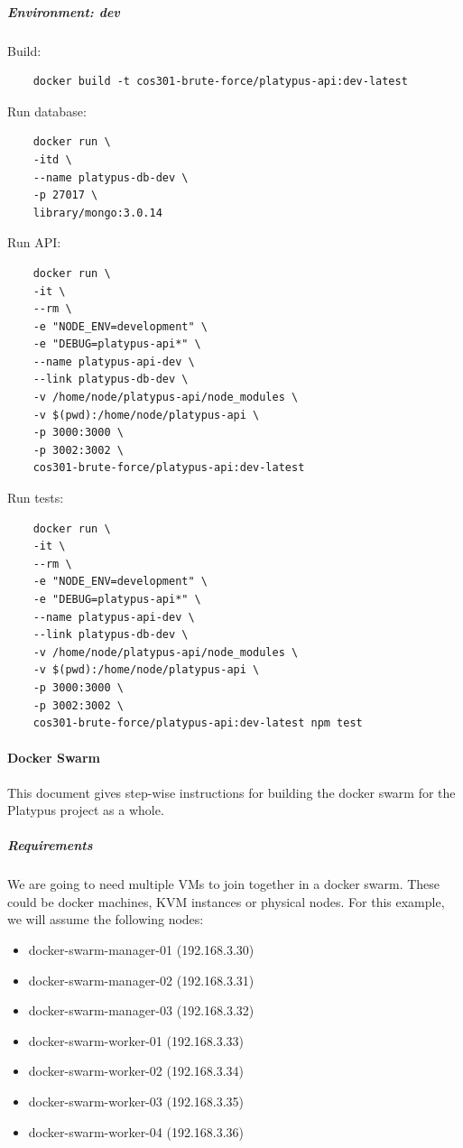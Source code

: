 \documentclass[12pt,a4paper]{article}
\begin{document}
    \subparagraph{Environment:	dev}
    \subparagraph{}
     Build: 

	\begin{lstlisting}
	docker build -t cos301-brute-force/platypus-api:dev-latest
	\end{lstlisting}

	\vspace{1cm}
	Run database:

	\begin{lstlisting}
	docker run \
    -itd \
    --name platypus-db-dev \
    -p 27017 \
    library/mongo:3.0.14
	\end{lstlisting}
	
    \vspace{1cm}
	Run API:
	
	\begin{lstlisting}
	docker run \
  	-it \
  	--rm \
  	-e "NODE_ENV=development" \
  	-e "DEBUG=platypus-api*" \
  	--name platypus-api-dev \
  	--link platypus-db-dev \
  	-v /home/node/platypus-api/node_modules \
  	-v $(pwd):/home/node/platypus-api \
  	-p 3000:3000 \
  	-p 3002:3002 \
  	cos301-brute-force/platypus-api:dev-latest
	\end{lstlisting}
	
    \vspace{1cm}
	Run tests:

    \begin{lstlisting}
	docker run \
    -it \
    --rm \
    -e "NODE_ENV=development" \
    -e "DEBUG=platypus-api*" \
    --name platypus-api-dev \
    --link platypus-db-dev \
    -v /home/node/platypus-api/node_modules \
    -v $(pwd):/home/node/platypus-api \
    -p 3000:3000 \
    -p 3002:3002 \
    cos301-brute-force/platypus-api:dev-latest npm test
	\end{lstlisting}
	
    \vspace{1cm}
 
	\paragraph{Docker Swarm}
        This document gives step-wise instructions for building the docker swarm for the Platypus project as a whole.

	\subparagraph{Requirements}
	\subparagraph{}
	We are going to need multiple VMs to join together in a docker swarm. These
could be docker machines, KVM instances or physical nodes. For this
example, we will assume the following nodes:
\begin{itemize}
\item docker-swarm-manager-01 (192.168.3.30)
\item docker-swarm-manager-02 (192.168.3.31)
\item docker-swarm-manager-03 (192.168.3.32)
\item docker-swarm-worker-01 (192.168.3.33)
\item docker-swarm-worker-02 (192.168.3.34)
\item docker-swarm-worker-03 (192.168.3.35)
\item docker-swarm-worker-04 (192.168.3.36)
\end{itemize}
\end{document}
